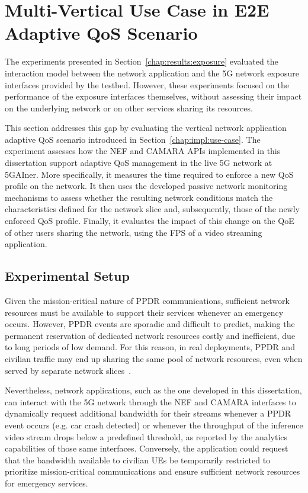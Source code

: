 \section{Multi-Vertical Use Case in \acs{E2E} Adaptive QoS Scenario}
\label{chap:results:use-case}

The experiments presented in Section~\ref{chap:results:exposure} evaluated the interaction model between the network application and the \acs{5G} network exposure interfaces provided by the testbed. However, these experiments focused on the performance of the exposure interfaces themselves, without assessing their impact on the underlying network or on other services sharing its resources.

This section addresses this gap by evaluating the vertical network application adaptive \acs{QoS} scenario introduced in Section~\ref{chap:impl:use-case}. The experiment assesses how the \acs{NEF} and CAMARA \acsp{API} implemented in this dissertation support adaptive \acs{QoS} management in the live \acs{5G} network at 5GAIner. More specifically, it measures the time required to enforce a new \acs{QoS} profile on the network. It then uses the developed passive network monitoring mechanisms to assess whether the resulting network conditions match the characteristics defined for the network slice and, subsequently, those of the newly enforced \acs{QoS} profile. Finally, it evaluates the impact of this change on the \acs{QoE} of other users sharing the network, using the \acs{FPS} of a video streaming application.

\subsection{Experimental Setup}
\label{chap:results:use-case:setup}

Given the mission-critical nature of \acs{PPDR} communications, sufficient network resources must be available to support their services whenever an emergency occurs. However, \acs{PPDR} events are sporadic and difficult to predict, making the permanent reservation of dedicated network resources costly and inefficient, due to long periods of low demand. For this reason, in real deployments, \acs{PPDR} and civilian traffic may end up sharing the same pool of network resources, even when served by separate network slices~\cite{CCAMPPDRDynamicResourceAllocation}.

Nevertheless, network applications, such as the one developed in this dissertation, can interact with the \acs{5G} network through the \acs{NEF} and CAMARA interfaces to dynamically request additional bandwidth for their streams whenever a \acs{PPDR} event occurs (e.g. car crash detected) or whenever the throughput of the inference video stream drops below a predefined threshold, as reported by the analytics capabilities of those same interfaces. Conversely, the application could request that the bandwidth available to civilian \acsp{UE} be temporarily restricted to prioritize mission-critical communications and ensure sufficient network resources for emergency services.


